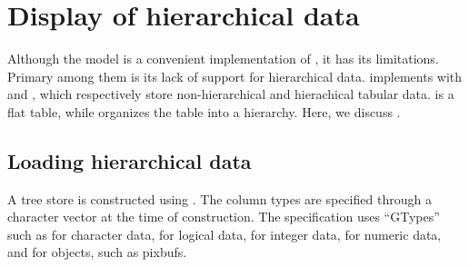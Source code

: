 
\section{Display of hierarchical data}
\label{sec:RGtk2:mvc:GtkTreeStore}

Although the  model is a convenient implementation
of , it has its limitations. Primary among them is
its lack of support for hierarchical data. \GTK\/ implements
 with  and
, which respectively store non-hierarchical and
hierachical tabular data.  is a flat table,
while  organizes the table into a hierarchy. Here,
we discuss .

\subsection{Loading hierarchical data}
  

A tree store is constructed using . The
column types are specified through a character vector at the time of
construction. The specification uses ``GTypes'' such as
 for character data,  for logical
data,  for integer data,  for numeric data,
and  for \GTK\/ objects, such as pixbufs.

